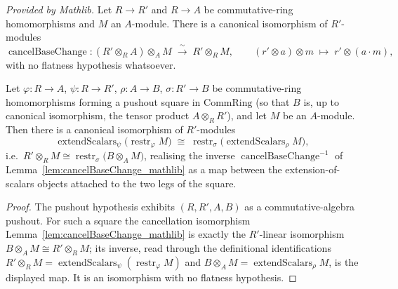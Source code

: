\begin{lemma}
  \label{lem:cancelBaseChange_mathlib}
  \mathlibok
  \textit{Provided by Mathlib.}
  Let \(R \to R'\) and \(R \to A\) be commutative-ring homomorphisms and \(M\) an
  \(A\)-module. There is a canonical isomorphism of \(R'\)-modules
  \[
    \operatorname{cancelBaseChange} :
    (R' \otimes_R A) \otimes_A M \;\xrightarrow{\ \sim\ }\; R' \otimes_R M,
    \qquad (r' \otimes a) \otimes m \;\mapsto\; r' \otimes (a \cdot m),
  \]
  with no flatness hypothesis whatsoever.
\end{lemma}

\begin{lemma}\leanok
  \label{lem:baseChangeCancelModuleIso}
  Let \(\varphi : R \to A\), \(\psi : R \to R'\), \(\rho : A \to B\),
  \(\sigma : R' \to B\) be commutative-ring homomorphisms forming a pushout square in
  \(\mathrm{CommRing}\) (so that \(B\) is, up to canonical isomorphism, the tensor
  product \(A \otimes_R R'\)), and let \(M\) be an \(A\)-module. Then there is a
  canonical isomorphism of \(R'\)-modules
  \[
    \operatorname{extendScalars}_\psi\bigl(\operatorname{restr}_\varphi M\bigr)
    \;\cong\;
    \operatorname{restr}_\sigma\bigl(\operatorname{extendScalars}_\rho M\bigr),
  \]
  i.e.\ \(R' \otimes_R M \cong \operatorname{restr}_\sigma\bigl(B \otimes_A M\bigr)\),
  realising the inverse \(\operatorname{cancelBaseChange}^{-1}\) of
  Lemma~\ref{lem:cancelBaseChange_mathlib} as a map between the extension-of-scalars
  objects attached to the two legs of the square.
\end{lemma}

\begin{proof}
  \leanok
  The pushout hypothesis exhibits \((R, R', A, B)\) as a commutative-algebra pushout.
  For such a square the cancellation isomorphism Lemma~\ref{lem:cancelBaseChange_mathlib} is
  exactly the \(R'\)-linear isomorphism \(B \otimes_A M \cong R' \otimes_R M\); its
  inverse, read through the definitional identifications
  \(R' \otimes_R M = \operatorname{extendScalars}_\psi(\operatorname{restr}_\varphi M)\)
  and \(B \otimes_A M = \operatorname{extendScalars}_\rho M\), is the displayed map. It
  is an isomorphism with no flatness hypothesis.
\end{proof}


